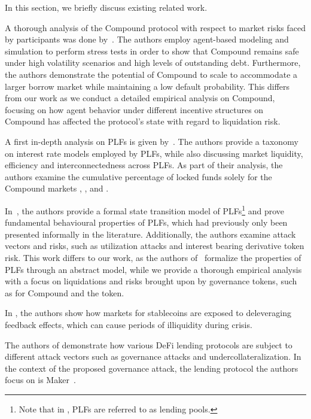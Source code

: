 In this section, we briefly discuss existing related work.

A thorough analysis of the Compound protocol with respect to market risks faced by participants was done by~\cite{Kao2020}.
The authors employ agent-based modeling and simulation to perform stress tests in order to show that Compound remains safe under high volatility scenarios and high levels of outstanding debt.
Furthermore, the authors demonstrate the potential of Compound to scale to accommodate a larger borrow market while maintaining a low default probability.
This differs from our work as we conduct a detailed empirical analysis on Compound, focusing on how agent behavior under different incentive structures on Compound has affected the protocol's state with regard to liquidation risk.  

A first in-depth analysis on PLFs is given by~\cite{gudgeon2020defi}.
The authors provide a taxonomy on interest rate models employed by PLFs, while also discussing market liquidity, efficiency and interconnectedness across PLFs.
As part of their analysis, the authors examine the cumulative percentage of locked funds solely for the Compound markets , , and .

In~\cite{bartoletti2020sok}, the authors provide a formal state transition model of PLFs\footnote{Note that in \cite{bartoletti2020sok}, PLFs are referred to as lending pools.} and prove fundamental behavioural properties of PLFs, which had previously only been presented informally in the literature.
Additionally, the authors examine attack vectors and risks, such as utilization attacks and interest bearing derivative token risk. 
This work differs to our work, as the authors of~\cite{bartoletti2020sok} formalize the properties of PLFs through an abstract model, while we provide a thorough empirical analysis with a focus on liquidations and risks brought upon by governance tokens, such as for Compound and the  token.

In \cite{klages2019stability}, the authors show how markets for stablecoins are exposed to deleveraging feedback effects, which can cause periods of illiquidity during crisis.

The authors of \cite{gudgeon2020decentralized} demonstrate how various DeFi lending protocols are subject to different attack vectors such as governance attacks and undercollateralization.
In the context of the proposed governance attack, the lending protocol the authors focus on is Maker~\cite{whitepaper:maker}.

